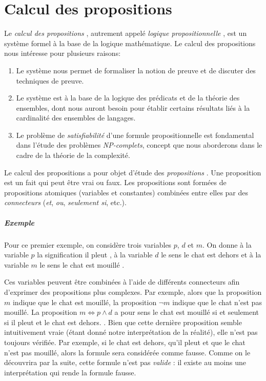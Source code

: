 \chapter{Calcul des propositions}

Le \og \textit{calcul des propositions} \fg{}, autrement appelé \og \textit{logique propositionnelle} \fg{}, est un système formel à la base de la logique mathématique. Le calcul des propositions nous intéresse pour plusieurs raisons:
\begin{enumerate}
\item
Le système nous permet de formaliser la notion de preuve et de discuter des techniques de preuve.
\item
Le système est à la base de la logique des prédicats et de la théorie des ensembles, dont nous auront besoin pour établir certains résultats liés à la cardinalité des ensembles de langages.
\item
Le problème de \og \textit{satisfiabilité} \fg{} d'une formule propositionnelle est fondamental dans l'étude des problèmes \textit{NP-complets}, concept que nous aborderons dans le cadre de la théorie de la complexité.
\end{enumerate}

Le calcul des propositions a pour objet d'étude des \og \textit{propositions} \fg{}.
Une proposition est un fait qui peut être vrai ou faux.
Les propositions sont formées de propositions atomiques (variables et constantes) combinées entre elles par des \og \textit{connecteurs} \fg{} (\textit{et}, \textit{ou}, \textit{seulement si}, etc.).

\paragraph{Exemple}

Pour ce premier exemple, on considère trois variables $p$, $d$ et $m$.
On donne à la variable $p$ la signification \og il pleut \fg{}, à la variable $d$ le sens \og le chat est dehors \fg{} et à la variable $m$ le sens \og le chat est mouillé \fg{}.

Ces variables peuvent être combinées à l'aide de différents connecteurs afin d'exprimer des propositions plus complexes.
Par exemple, alors que la proposition $m$ indique que le chat est mouillé, la proposition $\neg m$ indique que le chat n'est pas mouillé.
La proposition $m \iff p \wedge d$ a pour sens \og le chat est mouillé si et seulement si il pleut et le chat est dehors. \fg{}.
Bien que cette dernière proposition semble intuitivement vraie (étant donné notre interprétation de la réalité), elle n'est pas toujours vérifiée.
Par exemple, si le chat est dehors, qu'il pleut et que le chat n'est pas mouillé, alors la formule sera considérée comme fausse.
Comme on le découvrira par la suite, cette formule n'est pas \og \textit{valide} \fg{}: il existe au moins une interprétation qui rende la formule fausse.

